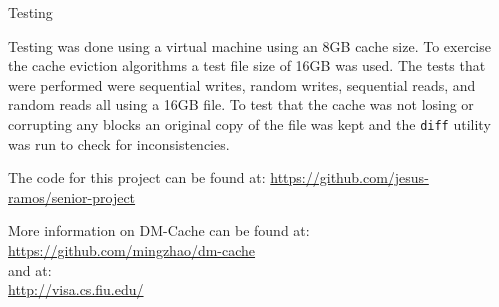 \documentclass[final,12pt]{beamer}
\begin{document}
\begin{frame}{}
\begin{columns}
    \begin{column}{.5\linewidth}
      \begin{block}{\large Testing}

        Testing was done using a virtual machine using an 8GB cache size. To
        exercise the cache eviction algorithms a test file size of 16GB was
        used. The tests that were performed were sequential writes, random
        writes, sequential reads, and random reads all using a 16GB file. To
        test that the cache was not losing or corrupting any blocks an original
        copy of the file was kept and the \texttt{diff} utility was run to check
        for inconsistencies.

        \vspace{\baselineskip}

        The code for this project can be found at:
        \url{https://github.com/jesus-ramos/senior-project}

        More information on DM-Cache can be found at:
        \url{https://github.com/mingzhao/dm-cache} \\
        and at: \\
        \url{http://visa.cs.fiu.edu/}

      \end{block}
    \end{column}

  \end{columns}


\end{frame}
\end{document}
